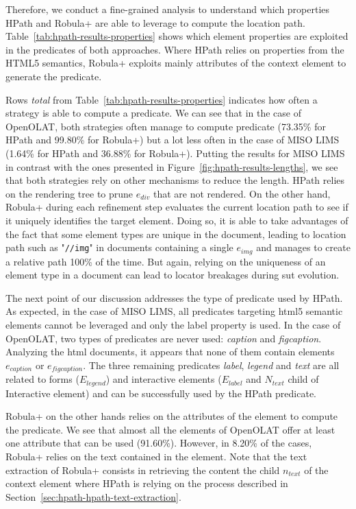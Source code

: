 Therefore, we conduct a fine-grained analysis to understand which properties HPath and Robula+ are able to leverage to compute the location path. Table~\ref{tab:hpath-results-properties} shows which element properties are exploited in the predicates of both approaches. Where HPath relies on properties from the HTML5 semantics, Robula+ exploits mainly attributes of the context element to generate the predicate.

Rows \emph{total} from Table~\ref{tab:hpath-results-properties} indicates how often a strategy is able to compute a predicate. We can see that in the case of OpenOLAT, both strategies often manage to compute predicate (73.35\% for HPath and 99.80\% for Robula+) but a lot less often in the case of MISO LIMS (1.64\% for HPath and 36.88\% for Robula+). Putting the results for MISO LIMS in contrast with the ones presented in Figure~\ref{fig:hpath-results-lengths}, we see that both strategies rely on other mechanisms to reduce the length. HPath relies on the rendering tree to prune $e_{div}$ that are not rendered. On the other hand, Robula+ during each refinement step evaluates the current location path to see if it uniquely identifies the target element. Doing so, it is able to take advantages of the fact that some element types are unique in the document, leading to location path such as "\texttt{//img}" in documents containing a single $e_{img}$ and manages to create a relative path 100\% of the time. But again, relying on the uniqueness of an element type in a document can lead to locator breakages during \gls{sut} evolution.

The next point of our discussion addresses the type of predicate used by HPath. As expected, in the case of MISO LIMS, all predicates targeting \gls{html}5 semantic elements cannot be leveraged and only the label property is used. In the case of OpenOLAT, two types of predicates are never used: \emph{caption} and \emph{figcaption}. Analyzing the \gls{html} documents, it appears that none of them contain elements $e_{caption}$ or $e_{figcaption}$. The three remaining predicates \emph{label}, \emph{legend} and \emph{text} are all related to forms ($E_{legend}$) and interactive elements ($E_{label}$ and $N_{text}$ child of Interactive element) and can be successfully used by the HPath predicate.

Robula+ on the other hands relies on the attributes of the element to compute the predicate. We see that almost all the elements of OpenOLAT offer at least one attribute that can be used (91.60\%). However, in 8.20\% of the cases, Robula+ relies on the text contained in the element. Note that the text extraction of Robula+ consists in retrieving the content the child $n_{text}$ of the context element where HPath is relying on the process described in Section~\ref{sec:hpath-hpath-text-extraction}.

